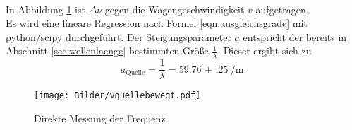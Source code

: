 \\In Abbildung \ref{fig:doppler} ist $\Delta \nu$ gegen die Wagengeschwindigkeit $v$ aufgetragen.
\\Es wird eine lineare Regression nach Formel \eqref{eqn:ausgleichsgrade} mit python/scipy \cite{scipy} durchgeführt.
Der Steigungsparameter $a$ entspricht der bereits in Abschnitt \ref{sec:wellenlaenge} bestimmten Größe $\frac{1}{\lambda}$.
Dieser ergibt sich zu
\begin{equation*}
	a_{\mathrm{Quelle}}=\frac{1}{\lambda}=\SI{59.76(25)}{\per\meter} \text{.}
\end{equation*}
\begin{figure}
	\centering
	\texttt{[image: Bilder/vquellebewegt.pdf]}
	\caption{Direkte Messung der Frequenz}
	\label{fig:doppler}
\end{figure}
\FloatBarrier
